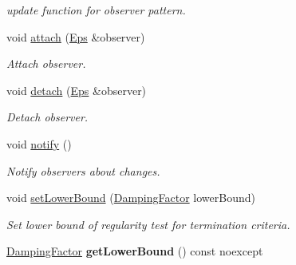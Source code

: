 \begin{DoxyCompactItemize}
\begin{DoxyCompactList}\small\item\em update function for observer pattern. \end{DoxyCompactList}\item 
\hypertarget{classSpacy_1_1Mixin_1_1MixinConnection_abb5520ee6b22dd993d78f142939a1ed4}{void \hyperlink{classSpacy_1_1Mixin_1_1MixinConnection_abb5520ee6b22dd993d78f142939a1ed4}{attach} (\hyperlink{classSpacy_1_1Mixin_1_1Eps_af616ae8e55a645cefd4d2d4504d6705a}{\-Eps} \&observer)}\label{classSpacy_1_1Mixin_1_1MixinConnection_abb5520ee6b22dd993d78f142939a1ed4}

\begin{DoxyCompactList}\small\item\em \-Attach observer. \end{DoxyCompactList}\item 
\hypertarget{classSpacy_1_1Mixin_1_1MixinConnection_adda739590c487679c26f60e50aedb73f}{void \hyperlink{classSpacy_1_1Mixin_1_1MixinConnection_adda739590c487679c26f60e50aedb73f}{detach} (\hyperlink{classSpacy_1_1Mixin_1_1Eps_af616ae8e55a645cefd4d2d4504d6705a}{\-Eps} \&observer)}\label{classSpacy_1_1Mixin_1_1MixinConnection_adda739590c487679c26f60e50aedb73f}

\begin{DoxyCompactList}\small\item\em \-Detach observer. \end{DoxyCompactList}\item 
\hypertarget{classSpacy_1_1Mixin_1_1MixinConnection_a1ddeaa78a3bb4a38c2cca36d1f99fe36}{void \hyperlink{classSpacy_1_1Mixin_1_1MixinConnection_a1ddeaa78a3bb4a38c2cca36d1f99fe36}{notify} ()}\label{classSpacy_1_1Mixin_1_1MixinConnection_a1ddeaa78a3bb4a38c2cca36d1f99fe36}

\begin{DoxyCompactList}\small\item\em \-Notify observers about changes. \end{DoxyCompactList}\item 
\hypertarget{classSpacy_1_1Mixin_1_1RegularityTest_a682ce022b0b5493e48f50f693ed64082}{void \hyperlink{classSpacy_1_1Mixin_1_1RegularityTest_a682ce022b0b5493e48f50f693ed64082}{set\-Lower\-Bound} (\hyperlink{classSpacy_1_1DampingFactor}{\-Damping\-Factor} lower\-Bound)}\label{classSpacy_1_1Mixin_1_1RegularityTest_a682ce022b0b5493e48f50f693ed64082}

\begin{DoxyCompactList}\small\item\em \-Set lower bound of regularity test for termination criteria. \end{DoxyCompactList}\item 
\hypertarget{classSpacy_1_1Mixin_1_1RegularityTest_a576995201badbfaee2064bf0d7749257}{\hyperlink{classSpacy_1_1DampingFactor}{\-Damping\-Factor} {\bfseries get\-Lower\-Bound} () const noexcept}\label{classSpacy_1_1Mixin_1_1RegularityTest_a576995201badbfaee2064bf0d7749257}


\end{DoxyCompactItemize}
